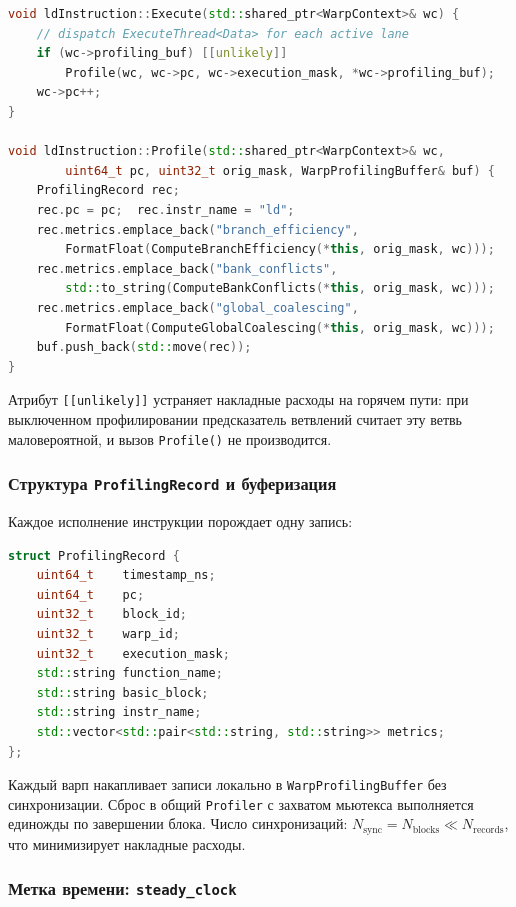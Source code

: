 \begin{lstlisting}[language=C++, caption={Автогенерируемые Execute() и Profile() для ld}]
void ldInstruction::Execute(std::shared_ptr<WarpContext>& wc) {
    // dispatch ExecuteThread<Data> for each active lane
    if (wc->profiling_buf) [[unlikely]]
        Profile(wc, wc->pc, wc->execution_mask, *wc->profiling_buf);
    wc->pc++;
}

void ldInstruction::Profile(std::shared_ptr<WarpContext>& wc,
        uint64_t pc, uint32_t orig_mask, WarpProfilingBuffer& buf) {
    ProfilingRecord rec;
    rec.pc = pc;  rec.instr_name = "ld";
    rec.metrics.emplace_back("branch_efficiency",
        FormatFloat(ComputeBranchEfficiency(*this, orig_mask, wc)));
    rec.metrics.emplace_back("bank_conflicts",
        std::to_string(ComputeBankConflicts(*this, orig_mask, wc)));
    rec.metrics.emplace_back("global_coalescing",
        FormatFloat(ComputeGlobalCoalescing(*this, orig_mask, wc)));
    buf.push_back(std::move(rec));
}
\end{lstlisting}

Атрибут \texttt{[[unlikely]]} устраняет накладные расходы на горячем пути:
при выключенном профилировании предсказатель ветвлений считает эту ветвь
маловероятной, и вызов \texttt{Profile()} не производится.

\subsubsection{Структура \texttt{ProfilingRecord} и буферизация}

Каждое исполнение инструкции порождает одну запись:

\begin{lstlisting}[language=C++, caption={Структура ProfilingRecord}]
struct ProfilingRecord {
    uint64_t    timestamp_ns;
    uint64_t    pc;
    uint32_t    block_id;
    uint32_t    warp_id;
    uint32_t    execution_mask;
    std::string function_name;
    std::string basic_block;
    std::string instr_name;
    std::vector<std::pair<std::string, std::string>> metrics;
};
\end{lstlisting}

Каждый варп накапливает записи локально в \texttt{WarpProfilingBuffer}
без синхронизации. Сброс в общий \texttt{Profiler} с захватом мьютекса
выполняется единожды по завершении блока. Число синхронизаций:
$N_{\mathrm{sync}} = N_{\mathrm{blocks}} \ll N_{\mathrm{records}}$,
что минимизирует накладные расходы.


\subsubsection{Метка времени: \texttt{steady\_clock}}

